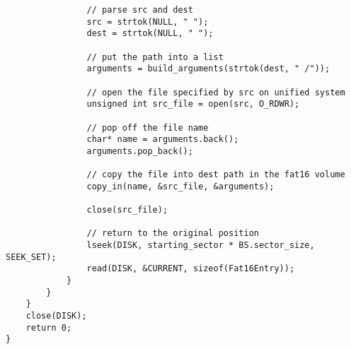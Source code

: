 \documentclass[12pt,letter,titlepage]{article}
\begin{document}
{{\begin{verbatim}
				// parse src and dest
				src = strtok(NULL, " ");
				dest = strtok(NULL, " ");

				// put the path into a list
				arguments = build_arguments(strtok(dest, " /"));

				// open the file specified by src on unified system
				unsigned int src_file = open(src, O_RDWR);

				// pop off the file name
				char* name = arguments.back();
				arguments.pop_back();

				// copy the file into dest path in the fat16 volume
				copy_in(name, &src_file, &arguments);

				close(src_file);

				// return to the original position
				lseek(DISK, starting_sector * BS.sector_size, SEEK_SET);
				read(DISK, &CURRENT, sizeof(Fat16Entry));
			}
		}
	}
	close(DISK);
	return 0;
}
\end{verbatim}
}}
\end{document}
